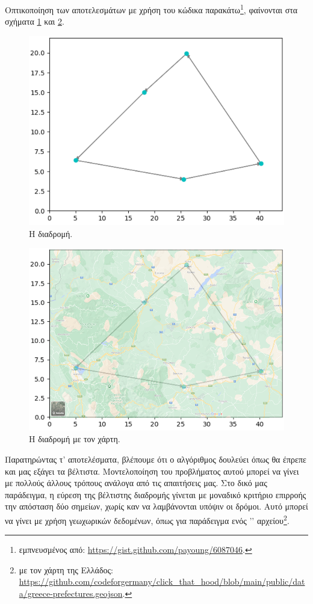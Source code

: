 Οπτικοποίηση των αποτελεσμάτων με χρήση του κώδικα παρακάτω\footnote{εμπνευσμένος από: \url{https://gist.github.com/payoung/6087046}.}, φαίνονται στα σχήματα \ref{route} και \ref{route2}.

\begin{figure}
    \centering
    \includegraphics[scale=0.60]{2947_thesis/pictures/route.png} 
    \caption{Η διαδρομή.}
    \label{route}
\end{figure}
\begin{figure}
    \centering
    \includegraphics[scale=0.60]{2947_thesis/pictures/route2.png} 
    \caption{Η διαδρομή με τον χάρτη.}
    \label{route2}
\end{figure}

Παρατηρώντας τ' αποτελέσματα, βλέπουμε ότι ο αλγόριθμος δουλεύει όπως θα έπρεπε και μας εξάγει τα βέλτιστα. Μοντελοποίηση του προβλήματος αυτού μπορεί να γίνει με πολλούς άλλους τρόπους ανάλογα από τις απαιτήσεις μας. Στο δικό μας παράδειγμα, η εύρεση της βέλτιστης διαδρομής γίνεται με μοναδικό κριτήριο επιρροής την απόσταση δύο σημείων, χωρίς καν να λαμβάνονται υπόψιν οι δρόμοι. Αυτό μπορεί να γίνει με χρήση γεωχωρικών δεδομένων, όπως για παράδειγμα ενός '' αρχείου\footnote{ με τον χάρτη της Ελλάδος: \url{https://github.com/codeforgermany/click_that_hood/blob/main/public/data/greece-prefectures.geojson}.}.

